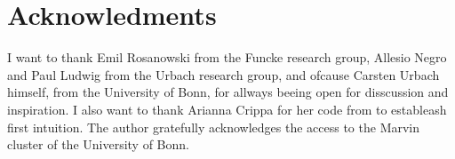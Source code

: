 
\section{Acknowledments}
I want to thank Emil Rosanowski from the Funcke research group, Allesio Negro and Paul Ludwig from the Urbach research group, and ofcause Carsten Urbach himself, from the University of Bonn, for allways beeing open for disscussion and inspiration. I also want to thank Arianna Crippa for her code from \cite{crippa2024} to estableash first intuition. 
The author gratefully acknowledges the access to the Marvin cluster of the University of Bonn.
